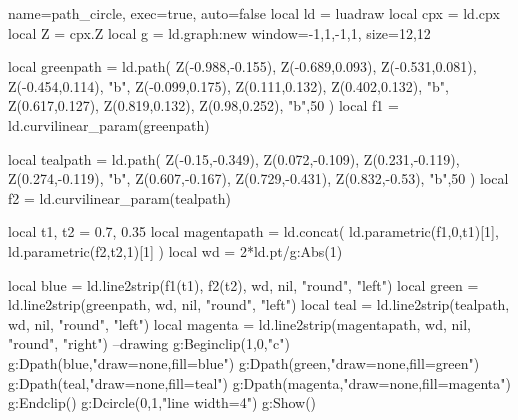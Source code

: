 \documentclass{standalone}%
\begin{document}
\begin{luadraw}{name=path_circle, exec=true, auto=false}
local ld = luadraw
local cpx = ld.cpx
local Z = cpx.Z
local g = ld.graph:new{ window={-1,1,-1,1}, size={12,12} }

local greenpath = ld.path( {Z(-0.988,-0.155), Z(-0.689,0.093), Z(-0.531,0.081), Z(-0.454,0.114), "b",
  Z(-0.099,0.175), Z(0.111,0.132), Z(0.402,0.132), "b", Z(0.617,0.127), Z(0.819,0.132),
  Z(0.98,0.252), "b"},50 )
local f1 = ld.curvilinear_param(greenpath)

local tealpath = ld.path( {Z(-0.15,-0.349), Z(0.072,-0.109), Z(0.231,-0.119), Z(0.274,-0.119), "b",
  Z(0.607,-0.167), Z(0.729,-0.431), Z(0.832,-0.53), "b"},50 )
local f2 = ld.curvilinear_param(tealpath)  

local t1, t2 = 0.7, 0.35
local magentapath = ld.concat( ld.parametric(f1,0,t1)[1], ld.parametric(f2,t2,1)[1] )
local wd = 2*ld.pt/g:Abs(1)

local blue = ld.line2strip({f1(t1), f2(t2)}, wd, nil, "round", "left")
local green = ld.line2strip(greenpath, wd, nil, "round", "left")
local teal = ld.line2strip(tealpath, wd, nil, "round", "left")
local magenta = ld.line2strip(magentapath, wd, nil, "round", "right")
--drawing
g:Beginclip({1,0,"c"})
    g:Dpath(blue,"draw=none,fill=blue")
    g:Dpath(green,"draw=none,fill=green")
    g:Dpath(teal,"draw=none,fill=teal")
    g:Dpath(magenta,"draw=none,fill=magenta")
g:Endclip()
g:Dcircle(0,1,"line width=4")
g:Show()
\end{luadraw}
\end{document}
